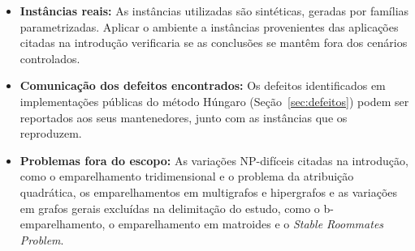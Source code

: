 \begin{itemize}
    \item \textbf{Instâncias reais:} As instâncias utilizadas são sintéticas, geradas por famílias parametrizadas. Aplicar o ambiente a instâncias provenientes das aplicações citadas na introdução verificaria se as conclusões se mantêm fora dos cenários controlados.
    \item \textbf{Comunicação dos defeitos encontrados:} Os defeitos identificados em implementações públicas do método Húngaro (Seção~\ref{sec:defeitos}) podem ser reportados aos seus mantenedores, junto com as instâncias que os reproduzem.
    \item \textbf{Problemas fora do escopo:} As variações NP-difíceis citadas na introdução, como o emparelhamento tridimensional e o problema da atribuição quadrática, os emparelhamentos em multigrafos e hipergrafos e as variações em grafos gerais excluídas na delimitação do estudo, como o b-emparelhamento, o emparelhamento em matroides e o \textit{Stable Roommates Problem}.
\end{itemize}
